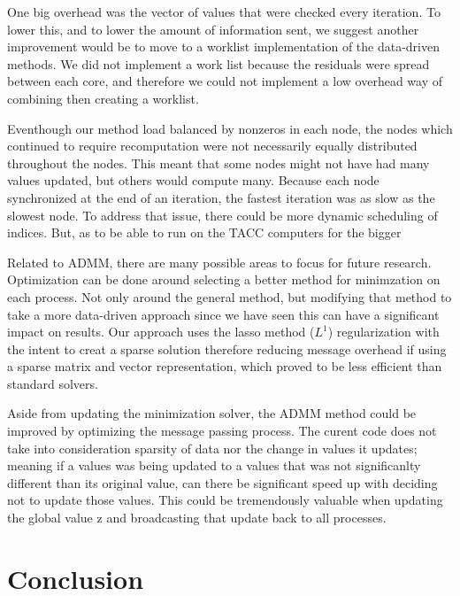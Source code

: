 \documentclass[letterpaper,11pt,onecolumn]{article}
\begin{document}
One big overhead was the vector of values that were checked every iteration. To lower this, and to lower the amount of information sent, we suggest another improvement would be to move to a worklist implementation of the data-driven methods. We did not implement a work list because the residuals were spread between each core, and therefore we could not implement a low overhead way of combining then creating a worklist. 

Eventhough our method load balanced by nonzeros in each node, the nodes which continued to require recomputation were not necessarily equally distributed throughout the nodes. This meant that some nodes might not have had many values updated, but others would compute many. Because each node synchronized at the end of an iteration, the fastest iteration was as slow as the slowest node. To address that issue, there could be more dynamic scheduling of indices. But, as to be able to run on the TACC computers for the bigger 

Related to ADMM, there are many possible areas to focus for future research. Optimization can be done around selecting a better method for minimzation on each process. Not only around the general method, but modifying that method to take a more data-driven approach since we have seen this can have a significant impact on results. Our approach uses the lasso method ($L^{1}$) regularization with the intent to creat a sparse solution therefore reducing message overhead if using a sparse matrix and vector representation, which proved to be less efficient than standard solvers. 

Aside from updating the minimization solver, the ADMM method could be improved by optimizing the message passing process. The curent code does not take into consideration sparsity of data nor the change in values it updates; meaning if a values was being updated to a values that was not significanlty different than its original value, can there be significant speed up with deciding not to update those values. This could be tremendously valuable when updating the global value z and broadcasting that update back to all processes.

\section{Conclusion}

\vfill\pagebreak


\end{document}
